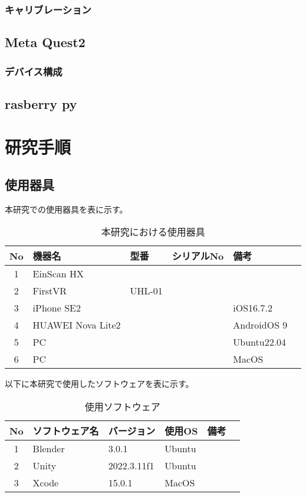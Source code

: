 \documentclass{ltjsreport}
\begin{document}
		\subsection{キャリブレーション}
	\section{Meta Quest2}
		\subsection{デバイス構成}
	\section{rasberry py}
	
\chapter{研究手順}
	\section{使用器具}
		本研究での使用器具を表に示す。
	\begin{table}[H]
	\begin{center}
	\caption{本研究における使用器具}
	\label{tab:usedev}
	\begin{tabular}{clllll} \toprule
	No&\multicolumn{1}{l}{機器名}&\multicolumn{1}{l}{型番}&\multicolumn{1}{l}{シリアルNo}&\multicolumn{1}{l}{備考}\\ \hline
	1&EinScan HX&&&\\
	2&FirstVR&UHL-01&&\\
	3&iPhone SE2&&&iOS16.7.2\\
	4&HUAWEI Nova Lite2&&&AndroidOS 9\\
	5&PC&&&Ubuntu22.04\\
	6&PC&&&MacOS\\
	\bottomrule
	\end{tabular}
	\end{center}
	\end{table}
	以下に本研究で使用したソフトウェアを表に示す。
	\begin{table}[H]
	\begin{center}
	\caption{使用ソフトウェア}
	\label{tab:usesoft}
	\begin{tabular}{clllll} \toprule
	No&\multicolumn{1}{l}{ソフトウェア名}&\multicolumn{1}{l}{バージョン}&\multicolumn{1}{l}{使用OS}&\multicolumn{1}{l}{備考}\\ \hline
	1&Blender&3.0.1&Ubuntu&\\
	2&Unity&2022.3.11f1&Ubuntu&\\
	3&Xcode&15.0.1&MacOS&\\
	\bottomrule
	\end{tabular}
	\end{center}
	\end{table}
\end{document}
